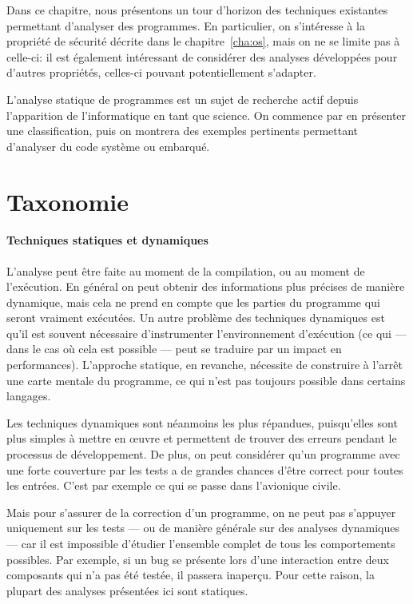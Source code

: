 Dans ce chapitre, nous présentons un tour d'horizon des techniques existantes
permettant d'analyser des programmes. En particulier, on s'intéresse à la
propriété de sécurité décrite dans le chapitre~\ref{cha:os}, mais on ne se
limite pas à celle-ci: il est également intéressant de considérer des analyses
développées pour d'autres propriétés, celles-ci pouvant potentiellement
s'adapter.

L'analyse statique de programmes est un sujet de recherche actif depuis
l'apparition de l'informatique en tant que science. On commence par en présenter
une classification, puis on montrera des exemples pertinents permettant
d'analyser du code système ou embarqué.

\section{Taxonomie}

\paragraph{Techniques statiques et dynamiques}

L'analyse peut être faite au moment de la compilation, ou au moment de
l'exécution. En général on peut obtenir des informations plus précises de
manière dynamique, mais cela ne prend en compte que les parties du programme qui
seront vraiment exécutées. Un autre problème des techniques dynamiques est qu'il
est souvent nécessaire d'instrumenter l'environnement d'exécution (ce qui ---
dans le cas où cela est possible --- peut se traduire par un impact en
performances). L'approche statique, en revanche, nécessite de construire à
l'arrêt une carte mentale du programme, ce qui n'est pas toujours possible dans
certains langages.

Les techniques dynamiques sont néanmoins les plus répandues, puisqu'elles sont
plus simples à mettre en œuvre et permettent de trouver des erreurs pendant le
processus de développement. De plus, on peut considérer qu'un programme avec une
forte couverture par les tests a de grandes chances d'être correct pour toutes
les entrées. C'est par exemple ce qui se passe dans l'avionique civile.

Mais pour s'assurer de la correction d'un programme, on ne peut pas s'appuyer
uniquement sur les tests --- ou de manière générale sur des analyses dynamiques
--- car il est impossible d'étudier l'ensemble complet de tous les comportements
possibles. Par exemple, si un bug se présente lors d'une interaction entre deux
composants qui n'a pas été testée, il passera inaperçu. Pour cette raison, la
plupart des analyses présentées ici sont statiques.

